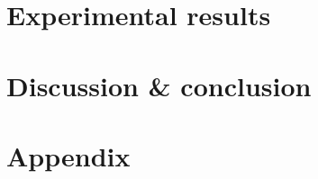 \documentclass{article}
\begin{document}
\section{Experimental results}
\label{sec:results}



\section{Discussion \& conclusion}


{


}

\clearpage
\appendix
\renewcommand\thefigure{\thesection.\arabic{figure}}
\renewcommand\thetable{\thesection.\arabic{table}} 
\section{Appendix}
	
\end{document}
